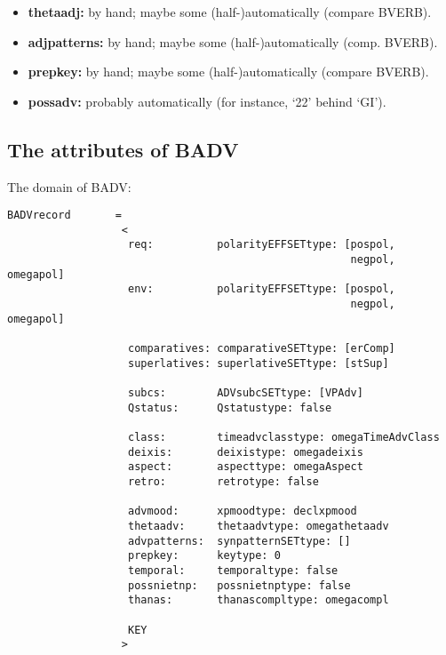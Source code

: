 \begin{itemize}
\item {\bf thetaadj:} by hand; maybe some (half-)automatically (compare BVERB).
 
\item {\bf adjpatterns:} by hand; maybe some (half-)automatically (comp. BVERB).
 
\item {\bf prepkey:} by hand; maybe some (half-)automatically (compare BVERB).
 
\item {\bf possadv:} probably automatically (for instance, `22' behind `GI').
\end{itemize}
 
\subsection{The attributes of BADV}
 
The domain of BADV:
 
\begin{verbatim}
BADVrecord       =
                  <
                   req:          polarityEFFSETtype: [pospol, 
                                                      negpol, omegapol]
                   env:          polarityEFFSETtype: [pospol, 
                                                      negpol, omegapol]
 
                   comparatives: comparativeSETtype: [erComp]  
                   superlatives: superlativeSETtype: [stSup]  
 
                   subcs:        ADVsubcSETtype: [VPAdv]
                   Qstatus:      Qstatustype: false
 
                   class:        timeadvclasstype: omegaTimeAdvClass
                   deixis:       deixistype: omegadeixis
                   aspect:       aspecttype: omegaAspect
                   retro:        retrotype: false
 
                   advmood:      xpmoodtype: declxpmood
                   thetaadv:     thetaadvtype: omegathetaadv
                   advpatterns:  synpatternSETtype: []
                   prepkey:      keytype: 0
                   temporal:     temporaltype: false
                   possnietnp:   possnietnptype: false
                   thanas:       thanascompltype: omegacompl
 
                   KEY
                  >
\end{verbatim}
 
